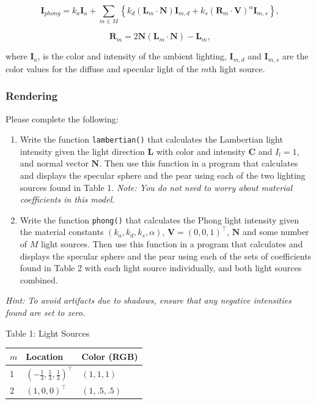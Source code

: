 \documentclass[11pt]{article}
\begin{document}
\[\mathbf{I}_{phong} = k_{a}\mathbf{I}_{a} + \sum_{m\in M}\left\{k_d(\mathbf{L}_{m}\cdot\mathbf{N})\mathbf{I}_{m,d} + k_{s}(\mathbf{R}_{m}\cdot\mathbf{V})^{\alpha}\mathbf{I}_{m,s}\right\}\text{,}\]

\[\mathbf{R}_{m} = 2\mathbf{N}(\mathbf{L}_{m}\cdot\mathbf{N}) - \mathbf{L}_{m}\text{,}\]

where \(\mathbf{I}_{a}\), is the color and intensity of the ambient
lighting, \(\mathbf{I}_{m,d}\) and \(\mathbf{I}_{m,s}\) are the color
values for the diffuse and specular light of the \(m\)th light source.

\subsubsection{Rendering}\label{rendering}

Please complete the following:

\begin{enumerate}
\def\labelenumi{\arabic{enumi}.}
\item
  Write the function \texttt{lambertian()} that calculates the
  Lambertian light intensity given the light direction \(\mathbf{L}\)
  with color and intensity \(\mathbf{C}\) and \(I_l = 1\), and normal
  vector \(\mathbf{N}\). Then use this function in a program that
  calculates and displays the specular sphere and the pear using each of
  the two lighting sources found in Table 1. \emph{Note: You do not need
  to worry about material coefficients in this model.}
\item
  Write the function \texttt{phong()} that calculates the Phong light
  intensity given the material constants \((k_a, k_d, k_s, \alpha)\),
  \(\mathbf{V} = (0, 0, 1)^\top\), \(\mathbf{N}\) and some number of
  \(M\) light sources. Then use this function in a program that
  calculates and displays the specular sphere and the pear using each of
  the sets of coefficients found in Table 2 with each light source
  individually, and both light sources combined.
\end{enumerate}

\emph{Hint: To avoid artifacts due to shadows, ensure that any negative
intensities found are set to zero.}

    Table 1: Light Sources

\begin{longtable}[]{@{}lll@{}}
\toprule
\(m\) & Location & Color (RGB)\tabularnewline
\midrule
\endhead
1 & \((-\tfrac{1}{3},\tfrac{1}{3},\tfrac{1}{3})^{\top}\) &
\((1,1,1)\)\tabularnewline
2 & \((1,0,0)^{\top}\) & \((1,.5,.5)\)\tabularnewline
\bottomrule
\end{longtable}
\end{document}
